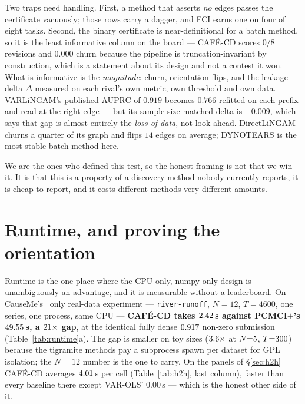 \documentclass[10pt,twocolumn]{article}
\newcommand{\cafe}{CAF\'E}
\DeclareRobustCommand{\cd}{\cafe{}\nobreakdash-CD}
\begin{document}
Two traps need handling. First, a method that asserts \emph{no} edges passes the
certificate vacuously; those rows carry a dagger, and FCI earns one on four of eight
tasks. Second, the binary certificate is near-definitional for a batch method, so it is
the least informative column on the board --- \cd{} scores $0/8$ revisions and $0.000$
churn because the pipeline is truncation-invariant by construction, which is a
statement about its design and not a contest it won. What is informative is the
\emph{magnitude}: churn, orientation flips, and the leakage delta $\Delta$ measured on
each rival's own metric, own threshold and own data. VARLiNGAM's published AUPRC of
$0.919$ becomes $0.766$ refitted on each prefix and read at the right edge --- but its
sample-size-matched delta is $-0.009$, which says that gap is almost entirely the
\emph{loss of data}, not look-ahead. DirectLiNGAM churns a quarter of its graph and
flips $14$ edges on average; DYNOTEARS is the most stable batch method here.



We are the ones who defined this test, so the honest framing is not that we win it.
It is that this is a property of a discovery method nobody currently reports, it is
cheap to report, and it costs different methods very different amounts.

\section{Runtime, and proving the orientation}\label{sec:runtime}
Runtime is the one place where the CPU-only, numpy-only design is unambiguously an
advantage, and it is measurable without a leaderboard. On CauseMe's~\cite{causeme}
only real-data
experiment --- \texttt{river-runoff}, $N{=}12$, $T{=}4600$, one series, one process,
same CPU --- \textbf{\cd{} takes $2.42$\,s against PCMCI$+$'s $49.55$\,s, a
$21\times$ gap}, at the identical fully dense $0.917$ non-zero submission
(Table~\ref{tab:runtime}a). The gap is smaller on toy sizes
($3.6\times$ at $N{=}5$, $T{=}300$) because the tigramite
methods pay a subprocess spawn per dataset for GPL
isolation; the $N{=}12$ number is the one to carry. On the panels of
\S\ref{sec:h2h} \cd{} averages $4.01$\,s per cell (Table~\ref{tab:h2h}, last
column), faster than every baseline there except VAR-OLS' $0.00$\,s --- which is the
honest other side of it.
\end{document}
